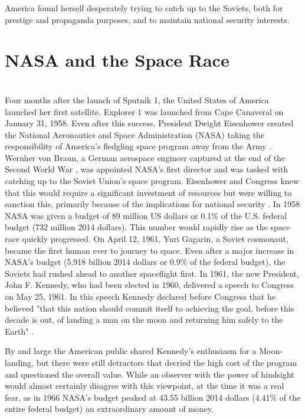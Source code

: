 \documentclass[10pt, journal]{IEEEtran}
\begin{document}
America found herself desperately trying to catch up to the Soviets, both for prestige and propaganda purposes, and to maintain national security interests.

\section{NASA and the Space Race}
~\\
Four months after the launch of Sputnik 1, the United States of America launched her first satellite. Explorer 1 was launched from Cape Canaveral on January 31, 1958. Even after this success, President Dwight Eisenhower created the National Aeronautics and Space Administration (NASA) taking the responsibility of America's fledgling space program away from the Army \cite{createNASA}. Wernher von Braun, a German aerospace engineer captured at the end of the Second World War \cite{neufeld}, was appointed NASA's first director and was tasked with catching up to the Soviet Union's space program. Eisenhower and Congress knew that this would require a significant investment of resources but were willing to sanction this, primarily because of the implications for national security \cite{neufeld}. In 1958 NASA was given a budget of 89 million US dollars or 0.1\% of the U.S. federal budget (732 million 2014 dollars). This number would rapidly rise as the space race quickly progressed. On April 12, 1961, Yuri Gagarin, a Soviet cosmonaut, became the first human ever to journey to space. Even after a major increase in NASA's budget (5.918 billion 2014 dollars or 0.9\% of the federal budget), the Soviets had rushed ahead to another spaceflight first. In 1961, the new President, John F. Kennedy, who had been elected in 1960, delivered a speech to Congress on May 25, 1961. In this speech Kennedy declared before Congress that he believed "that this nation should commit itself to achieving the goal, before this decade is out, of landing a man on the moon and returning him safely to the Earth" \cite{kenspeech}.

By and large the American public shared Kennedy's enthusiasm for a Moon-landing, but there were still detractors that decried the high cost of the program and questioned the overall value. While an observer with the power of hindsight would almost certainly disagree with this viewpoint, at the time it was a real fear, as in 1966 NASA's budget peaked at 43.55 billion 2014 dollars (4.41\% of the entire federal budget) an extraordinary amount of money.
\end{document}
